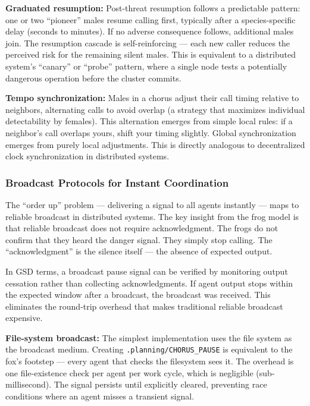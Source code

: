 \documentclass[11pt,letterpaper]{article}
\begin{document}
\textbf{Graduated resumption:} Post-threat resumption follows a predictable pattern: one or two ``pioneer'' males resume calling first, typically after a species-specific delay (seconds to minutes). If no adverse consequence follows, additional males join. The resumption cascade is self-reinforcing --- each new caller reduces the perceived risk for the remaining silent males. This is equivalent to a distributed system's ``canary'' or ``probe'' pattern, where a single node tests a potentially dangerous operation before the cluster commits.

\textbf{Tempo synchronization:} Males in a chorus adjust their call timing relative to neighbors, alternating calls to avoid overlap (a strategy that maximizes individual detectability by females). This alternation emerges from simple local rules: if a neighbor's call overlaps yours, shift your timing slightly. Global synchronization emerges from purely local adjustments. This is directly analogous to decentralized clock synchronization in distributed systems.

\subsubsection{Broadcast Protocols for Instant Coordination}

The ``order up'' problem --- delivering a signal to all agents instantly --- maps to reliable broadcast in distributed systems. The key insight from the frog model is that reliable broadcast does not require acknowledgment. The frogs do not confirm that they heard the danger signal. They simply stop calling. The ``acknowledgment'' is the silence itself --- the absence of expected output.

In GSD terms, a broadcast pause signal can be verified by monitoring output cessation rather than collecting acknowledgments. If agent output stops within the expected window after a broadcast, the broadcast was received. This eliminates the round-trip overhead that makes traditional reliable broadcast expensive.

\textbf{File-system broadcast:} The simplest implementation uses the file system as the broadcast medium. Creating \texttt{.planning/CHORUS\_PAUSE} is equivalent to the fox's footstep --- every agent that checks the filesystem sees it. The overhead is one file-existence check per agent per work cycle, which is negligible (sub-millisecond). The signal persists until explicitly cleared, preventing race conditions where an agent misses a transient signal.
\end{document}
